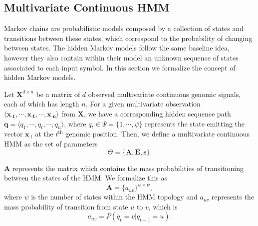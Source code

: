 \subsection{Multivariate Continuous HMM}
\label{sec:multivariate.continuous.hmm}

Markov chains are probabilistic models composed by a collection of states and transitions between these states, which correspond to the probability of changing between states. The hidden Markov models follow the same baseline idea, however they also contain within their model an unknown sequence of states associated to each input symbol. In this section we formalize the concept of hidden Markov models.

Let $\mathbf{X}^{d \times n}$ be a matrix of $d$ observed multivariate continuous genomic signals, each of which has length $n$. For a given multivariate observation $\langle \mathbf{{x}_{\cdot 1}}, \cdots, \mathbf{{x}_{\cdot t}}, \cdots, \mathbf{{x}_{\cdot n}} \rangle$ from $\mathbf{X}$, we have a corresponding hidden sequence path $\mathbf{q} = \langle q_1, \cdots, q_t, \cdots, q_n \rangle$, where $ q_t \in \Psi = \{1, \cdots, \psi\} $ represents the state emitting the vector $ {\mathbf{x}}_{\cdot t} $ at the $t^{\text{th}}$ genomic position. Then, we define a multivariate continuous HMM as the set of parameters
\begin{equation}
  \label{eq:hmm.theta}
  \Theta= \{\mathbf{A}, \mathbf{E}, \mathbf{s}\}.
\end{equation}

$\mathbf{A}$ represents the matrix which contains the mass probabilities of transitioning between the states of the HMM. We formalize this as
\begin{equation}
  \label{eq:hmm.a}
  \mathbf{A} = {\{a_{uv}\}}^{\psi \times \psi},
\end{equation}
where $\psi$ is the number of states within the HMM topology and $a_{uv}$ represents the mass probability of transition from state $u$ to $v$, which is
\begin{equation}
  \label{eq:hmm.transition}
  a_{uv} = P(q_t = v | q_{t-1} = u).
\end{equation}

